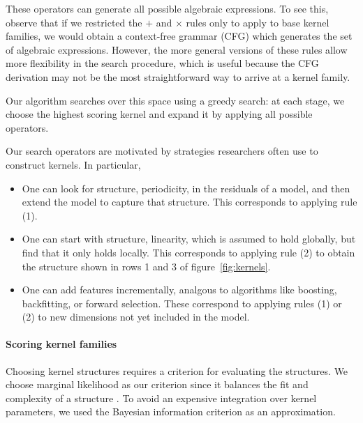 \documentclass[twoside]{article}
\begin{document}
These operators can generate all possible algebraic expressions.
To see this, observe that if we restricted the $+$ and $\times$ rules only to apply to base kernel families, we would obtain a context-free grammar (CFG) which generates the set of algebraic expressions.
However, the more general versions of these rules allow more flexibility in the search procedure, which is useful because the CFG derivation may not be the most straightforward way to arrive at a kernel family.

Our algorithm searches over this space using a greedy search: at each stage, we choose the highest scoring kernel and expand it by applying all possible operators.

Our search operators are motivated by strategies researchers often use to construct kernels.
In particular,
\begin{itemize}
\item One can look for structure, \eg periodicity, in the residuals of a model, and then extend the model to capture that structure.
This corresponds to applying rule (1).
\item One can start with structure, \eg linearity, which is assumed to hold globally, but find that it only holds locally.
This corresponds to applying rule (2) to obtain the structure shown in rows 1 and 3 of figure~\ref{fig:kernels}.
\item One can add features incrementally, analgous to algorithms like boosting, backfitting, or forward selection.
These correspond to applying rules (1) or (2) to new dimensions not yet included in the model.
\end{itemize}

\paragraph{Scoring kernel families}

Choosing kernel structures requires a criterion for evaluating the structures.
We choose marginal likelihood as our criterion since it balances the fit and complexity of a structure \citep[e.g.][]{rasmussen2001occam}.
To avoid an expensive integration over kernel parameters, we used the Bayesian information criterion \citep{schwarz1978estimating} as an approximation.
\end{document}
